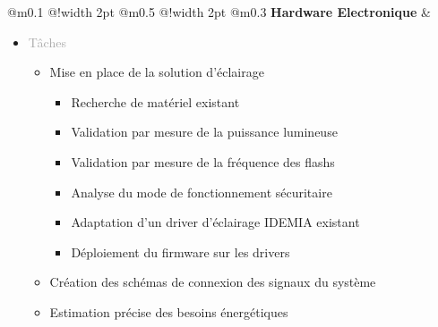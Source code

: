 \documentclass{article}
\begin{document}
\begin{tabular}
    {
        @{}m{}
        @{\hspace{0.001\textwidth}}!{\color{secondaryBlue}\vline width 2pt}
        @{}m{0.5\textwidth}
        @{\hspace{0.025\textwidth}}!{\color{secondaryBlue}\vline width 2pt}
        @{}m{0.3\textwidth}
    }
    \textcolor{secondaryBlue}{\textbf{Hardware Electronique}}           
    &
    \begin{itemize}[label={}, topsep=8pt, partopsep=0pt, itemsep=0.5pt, parsep=2pt, after=\vspace*{-\baselineskip}]
        \setlength{\itemsep}{10pt} 
        \item \textcolor{darkGray}{Tâches}
        \begin{itemize}[label={\textcolor{gray!80}{$\checkmark$}}, topsep=8pt, partopsep=0pt, itemsep=0.5pt, parsep=2pt] 
            \item \textcolor{gray!80}{Mise en place de la solution d'éclairage}
            \begin{itemize}[label={\textcolor{gray!80}{$\triangleright$}}, topsep=0pt, partopsep=0pt, itemsep=0.5pt, parsep=2pt] 
                \item \textcolor{gray!80}{Recherche de matériel existant}
                \item \textcolor{gray!80}{Validation par mesure de la puissance lumineuse}
                \item \textcolor{gray!80}{Validation par mesure de la fréquence des flashs}
                \item \textcolor{gray!80}{Analyse du mode de fonctionnement sécuritaire}
                \item \textcolor{gray!80}{Adaptation d'un driver d'éclairage IDEMIA existant}
                \item \textcolor{gray!80}{Déploiement du firmware sur les drivers}
            \end{itemize}
            \item \textcolor{gray!80}{Création des schémas de connexion des signaux du système}
            \item \textcolor{gray!80}{Estimation précise des besoins énergétiques}
            

\end{itemize}
\end{itemize}
\end{tabular}
\end{document}
